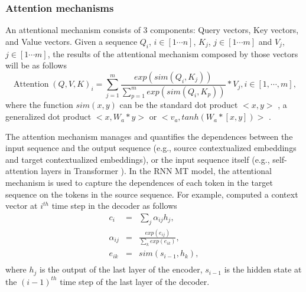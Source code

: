\subsubsection{Attention mechanisms \label{ssec:attention}}
An attentional mechanism consists of 3 components: Query vectors, Key vectors, and Value vectors. Given a sequence $Q_i$, $i \in [1 \cdots n]$, $K_j$, $j \in [1 \cdots m]$ and $V_j$, $j \in [1 \cdots m]$, the results
of the attentional mechanism composed by those vectors will be as follows
\begin{equation}
\operatorname{Attention}(Q,V,K)_i = \displaystyle{\mathop{\sum}_{j=1}^{m}} \frac{exp(sim(Q_i,K_j))}{\displaystyle{\mathop{\sum}_{p=1}^{m}}exp(sim(Q_i,K_p))}*V_j, i \in [1, \cdots, m],
\end{equation}
where the function $sim(x,y)$ can be the standard dot product $<x,y>$ \citep{Vaswani17attention}, a generalized dot product $<x,W_a*y>$ or $<v_a, tanh(W_a*[x,y])>$ \citep{Luong15stanford, Bahdanau15learning}.

The attention mechanism manages and quantifies the dependences between the input sequence and the output sequence (e.g., source contextualized embeddings and target contextualized embeddings), or the input sequence itself (e.g., self-attention layers in Transformer \citep{Vaswani17attention}). In the RNN MT model, the attentional mechanism is used to capture the dependences of each token in the target sequence on the tokens in the source sequence. For example, \citet{Bahdanau15learning} computed a context vector at $i^{th}$ time step in the decoder as follows
\begin{equation}
\begin{array}{rcl}
c_i &=& \sum_{j} \alpha_{ij} h_j, \\
\alpha_{ij} &=& \frac{exp(e_{ij})}{\sum_{k}exp(e_{ik})}, \\
e_{ik} &=& sim(s_{i-1},h_k),\\
\end{array}
\end{equation}
where $h_j$ is the output of the last layer of the encoder, $s_{i-1}$ is the hidden state at the $(i-1)^{th}$ time step of the last layer of the decoder. 


